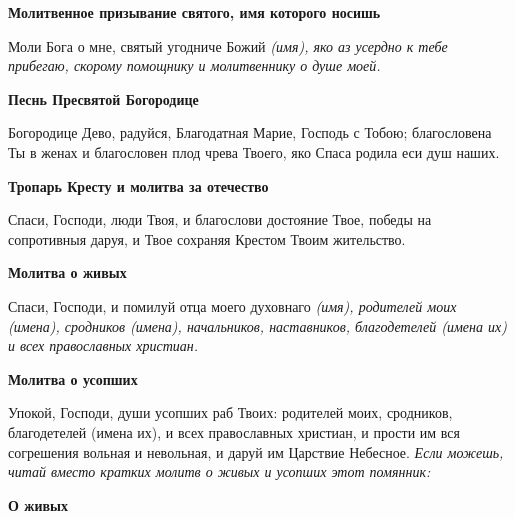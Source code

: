 \medskip
\bfseries Молитвенное призывание святого, имя которого носишь\normalfont{}


Моли Бога о мне, святый угодниче Божий \itshape (имя)\normalfont{}, яко аз усердно к тебе прибегаю, скорому помощнику и молитвеннику о душе моей. 


\medskip
\bfseries Песнь Пресвятой Богородице\normalfont{}


Богородице Дево, радуйся, Благодатная Марие, Господь с Тобою; благословена Ты в женах и благословен плод чрева Твоего, яко Спаса родила еси душ наших. 


\medskip
\bfseries Тропарь Кресту и молитва за отечество


\normalfont{}Спаси, Господи, люди Твоя, и благослови достояние Твое, победы на сопротивныя даруя, и Твое сохраняя Крестом Твоим жительство.


\medskip
\bfseries Молитва о живых


\normalfont{}Спаси, Господи, и помилуй отца моего духовнаго \itshape (имя)\normalfont{}, родителей моих \itshape (имена)\normalfont{}, сродников \itshape (имена)\normalfont{}, начальников, наставников, благодетелей \itshape (имена их)\normalfont{} и всех православных христиан.


\medskip
\bfseries Молитва о усопших\normalfont{}


Упокой, Господи, души усопших раб Твоих: родителей моих, сродников, благодетелей (имена их), и всех православных христиан, и прости им вся согрешения вольная и невольная, и даруй им Царствие Небесное. 
\itshape Если можешь, читай вместо кратких молитв о живых и усопших этот помянник:\normalfont{}


\medskip
\bfseries О живых


